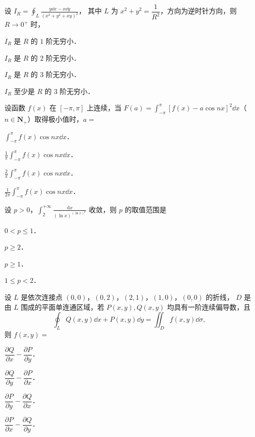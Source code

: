
\begin{question}[index=1]
设 $\displaystyle I_R=\oint_L\frac{y\dd x-x\dd y}{(x^2+y^2+xy)^2}$，
其中 $L$ 为 $x^2+y^2=\dfrac{1}{R^2}$，方向为逆时针方向，则 $R\to0^+$ 时，
\begin{choices}[columns=2]
\item $I_R$ 是 $R$ 的 $1$ 阶无穷小．
\item $I_R$ 是 $R$ 的 $2$ 阶无穷小．
\item $I_R$ 是 $R$ 的 $3$ 阶无穷小．
\item $I_R$ 至少是 $R$ 的 $3$ 阶无穷小．
\end{choices}
\end{question}
\QuestionBreak

\begin{question}[index=2]
设函数 $f(x)$ 在 $[-\pi,\pi]$ 上连续，当
$\displaystyle F(a)=\int_{-\pi}^{\pi}[f(x)-a\cos nx]^2\dd x$（$n\in\symbf{N}_+$）取得极小值时，$a=$
\begin{choices}[columns=2,label-pos=left]
\item $\displaystyle\int_{-\pi}^{\pi} f(x)\cos nx\dd x$．
\item $\displaystyle\frac{1}{\pi}\int_{-\pi}^{\pi} f(x)\cos nx\dd x$．
\item $\displaystyle\frac{2}{\pi}\int_{-\pi}^{\pi} f(x)\cos nx\dd x$．
\item $\displaystyle\frac{1}{2\pi}\int_{-\pi}^{\pi} f(x)\cos nx\dd x$．
\end{choices}
\end{question}
\QuestionBreak

\begin{question}[index=3]
设 $p>0$，$\displaystyle\int_2^{+\infty}\frac{\mathrm dx}{(\ln x)^{(\ln x)^p}}$ 收敛，则 $p$ 的取值范围是
\begin{choices}[columns=2]
\item $0<p\le1$．
\item $p\ge2$．
\item $p\ge1$．
\item $1\le p<2$．
\end{choices}
\end{question}
\QuestionBreak

\begin{question}[index=4]
设 $L$ 是依次连接点 $(0,0)$，$(0,2)$，$(2,1)$，$(1,0)$，$(0,0)$ 的折线，
$D$ 是由 $L$ 围成的平面单连通区域，若 $P(x,y),Q(x,y)$ 均具有一阶连续偏导数，且
\[
\oint_L Q(x,y)\dd x+P(x,y)\dd y=\iint_D f(x,y)\dd\sigma,
\]
则 $f(x,y)=$
\begin{choices}[columns=4,label-pos=left]
\item $\dfrac{\partial Q}{\partial x}-\dfrac{\partial P}{\partial y}$．
\item $\dfrac{\partial Q}{\partial y}-\dfrac{\partial P}{\partial x}$．
\item $\dfrac{\partial P}{\partial y}-\dfrac{\partial Q}{\partial x}$．
\item $\dfrac{\partial P}{\partial x}-\dfrac{\partial Q}{\partial y}$．
\end{choices}
\end{question}
\QuestionBreak

